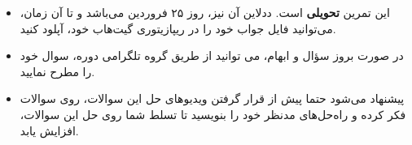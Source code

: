 \begin{tcolorbox}[colback=blue!5!white, colframe=black!75!black, title=نکات مهم در مورد تمرین ]
	
	\begin{itemize}
		\item این تمرین \textbf{تحویلی} است. ددلاین آن نیز، روز ۲۵ فروردین می‌باشد و تا آن زمان، می‌توانید فایل جواب خود را در ریپازیتوری گیت‌هاب خود، آپلود کنید.
		
		\item 
		در صورت بروز سؤال و ابهام، می توانید از طریق گروه تلگرامی دوره، سوال خود را مطرح نمایید.
		
		\item 
		پیشنهاد می‌شود حتما پیش از قرار گرفتن ویدیوهای حل این سوالات، روی سوالات فکر کرده و راه‌حل‌های مدنظر خود را بنویسید تا تسلط شما روی حل این سوالات، افزایش یابد.
		
	\end{itemize}
	
\end{tcolorbox}